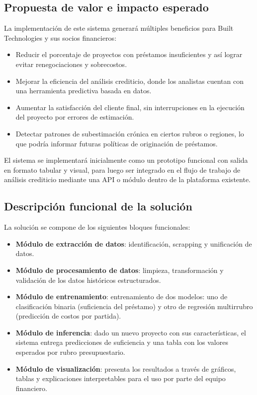 \documentclass[
11pt, %
]{charter}
\begin{document}
\subsection*{Propuesta de valor e impacto esperado}

La implementación de este sistema generará múltiples beneficios para Built Technologies y sus socios financieros:

\begin{itemize}
    \item Reducir el porcentaje de proyectos con préstamos insuficientes y así lograr evitar renegociaciones y sobrecostos.
    \item Mejorar la eficiencia del análisis crediticio, donde los analistas cuentan con una herramienta predictiva basada en datos.
    \item Aumentar la satisfacción del cliente final, sin interrupciones en la ejecución del proyecto por errores de estimación.
    \item Detectar patrones de subestimación crónica en ciertos rubros o regiones, lo que podría informar futuras políticas de originación de préstamos.
\end{itemize}

El sistema se implementará inicialmente como un prototipo funcional con salida en formato tabular y visual, para luego ser integrado en el flujo de trabajo de análisis crediticio mediante una API o módulo dentro de la plataforma existente.

\subsection*{Descripción funcional de la solución}

La solución se compone de los siguientes bloques funcionales:

\begin{itemize}
    \item \textbf{Módulo de extracción de datos}: identificación, scrapping y unificación de datos.
    \item \textbf{Módulo de procesamiento de datos}: limpieza, transformación y validación de los datos históricos estructurados.
    \item \textbf{Módulo de entrenamiento}: entrenamiento de dos modelos: uno de clasificación binaria (suficiencia del préstamo) y otro de regresión multirrubro (predicción de costos por partida).
    \item \textbf{Módulo de inferencia}: dado un nuevo proyecto con sus características, el sistema entrega predicciones de suficiencia y una tabla con los valores esperados por rubro presupuestario.
    \item \textbf{Módulo de visualización}: presenta los resultados a través de gráficos, tablas y explicaciones interpretables para el uso por parte del equipo financiero.
\end{itemize}
\end{document}
